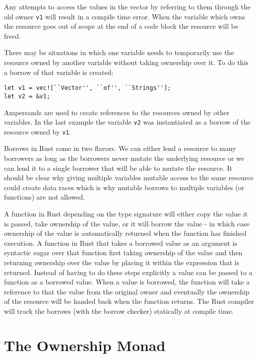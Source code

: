\documentclass[onehalf,11pt]{beavtex}
\begin{document}
Any attempts to access the values in the vector by referring to them through
the old owner \texttt{v1} will result in a compile time error.
When the variable which owns the resource goes out of scope at the end of a
code block the resource will be freed.

There may be situations in which one variable needs to temporarily
use the resource owned by another variable without taking ownership over it.
To do this a borrow of that variable is created:

\begin{verbatim}
let v1 = vec![``Vector'', ``of'', ``Strings''];
let v2 = &v1;
\end{verbatim}

Ampersands are used to create references to the resources owned by other
variables.
In the last example the variable \texttt{v2} was instantiated as a borrow
of the resource owned by \texttt{v1}.

Borrows in Rust come in two flavors. We can either lend a resource to many
borrowers as long as the borrowers never mutate the underlying resource or we
can lend it to a single borrower that will be able to mutate the
resource.\cite{rust_book_borrowing}
It should be clear why giving multiple variables mutable access to
the same resource could create data races which is why mutable borrows to
multiple variables (or functions) are not allowed.

A function in Rust depending on the type signature will either copy the value
it is passed, take ownership of the value, or it will borrow the value - in
which case ownership of the value is automatically returned when the function
has finished execution.\cite{rust_book_ownership}
A function in Rust that takes a borrowed value as an argument is
syntactic sugar over that function first taking ownership of the value and then
returning ownership over the value by placing it within the expression that is
returned.
Instead of having to do these steps explicitly a value can be passed to a
function as a borrowed value.  When a value is borrowed, the function will take
a reference to that the value from the original owner and eventually the
ownership of the resource will be handed back when the function returns.
The Rust compiler will track the borrows (with the borrow checker) statically at
compile time.

\chapter{The Ownership Monad}
\end{document}
